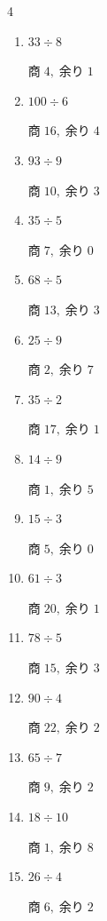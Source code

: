 \begin{multicols}{4}
\begin{enumerate}
  \item $33 \div 8$

        $商\; 4,\; 余り\; 1$

  \item $100 \div 6$

        $商\; 16,\; 余り\; 4$

  \item $93 \div 9$

        $商\; 10,\; 余り\; 3$

\columnbreak %

  \item $35 \div 5$

        $商\; 7,\; 余り\; 0$

  \item $68 \div 5$

        $商\; 13,\; 余り\; 3$

  \item $25 \div 9$

        $商\; 2,\; 余り\; 7$

  \item $35 \div 2$

        $商\; 17,\; 余り\; 1$

  \item $14 \div 9$

        $商\; 1,\; 余り\; 5$

  \item $15 \div 3$

        $商\; 5,\; 余り\; 0$

  \item $61 \div 3$

        $商\; 20,\; 余り\; 1$

  \item $78 \div 5$

        $商\; 15,\; 余り\; 3$

  \item $90 \div 4$

        $商\; 22,\; 余り\; 2$

  \item $65 \div 7$

        $商\; 9,\; 余り\; 2$

  \item $18 \div 10$

        $商\; 1,\; 余り\; 8$

  \item $26 \div 4$

        $商\; 6,\; 余り\; 2$


\end{enumerate}
\end{multicols}
